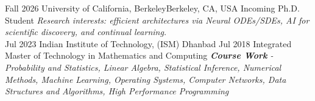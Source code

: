 \begin{educations}
  \education
    {Fall 2026}   {University of California, Berkeley}{Berkeley, CA, USA}
    {} {Incoming Ph.D. Student}
    {}
    {\it Research interests: efficient architectures via Neural ODEs/SDEs, AI for scientific discovery, and continual learning.}
    \\[3mm]
  \education
    {Jul 2023}   {Indian Institute of Technology, (ISM) Dhanbad}{ }
    {Jul 2018} {Integrated Master of Technology in Mathematics and Computing}
    {}
    {\it {\bf Course Work} - Probability and Statistics, Linear Algebra, Statistical Inference, Numerical Methods, Machine Learning, Operating Systems, Computer Networks, Data Structures and Algorithms, High Performance Programming}
\end{educations}
\vspace{-2mm}
